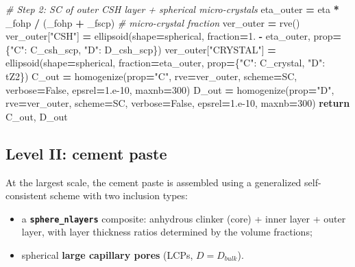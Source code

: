 \documentclass[
  a4paper,
  numbers=noendperiod,
  DIV=12]{scrreprt}
\newenvironment{Shaded}{\begin{snugshade}}{\end{snugshade}}
\newcommand{\CommentTok}[1]{\textcolor[rgb]{0.56,0.35,0.01}{\textit{#1}}}
\newcommand{\ControlFlowTok}[1]{\textcolor[rgb]{0.13,0.29,0.53}{\textbf{#1}}}
\newcommand{\DecValTok}[1]{\textcolor[rgb]{0.00,0.00,0.81}{#1}}
\newcommand{\FloatTok}[1]{\textcolor[rgb]{0.00,0.00,0.81}{#1}}
\newcommand{\NormalTok}[1]{#1}
\newcommand{\OperatorTok}[1]{\textcolor[rgb]{0.81,0.36,0.00}{\textbf{#1}}}
\newcommand{\StringTok}[1]{\textcolor[rgb]{0.31,0.60,0.02}{#1}}
\newcommand{\VariableTok}[1]{\textcolor[rgb]{0.00,0.00,0.00}{#1}}
\providecommand{\tightlist}{%
  \setlength{\itemsep}{0pt}\setlength{\parskip}{0pt}}
\begin{document}
\begin{Shaded}
\begin{Highlighting}[]
    \CommentTok{\# Step 2: SC of outer CSH layer + spherical micro{-}crystals}
\NormalTok{    eta\_outer }\OperatorTok{=}\NormalTok{ eta }\OperatorTok{*}\NormalTok{ \_fohp }\OperatorTok{/}\NormalTok{ (\_fohp }\OperatorTok{+}\NormalTok{ \_fscp)  }\CommentTok{\# micro{-}crystal fraction}
\NormalTok{    ver\_outer }\OperatorTok{=}\NormalTok{ rve()}
\NormalTok{    ver\_outer[}\StringTok{"CSH"}\NormalTok{]     }\OperatorTok{=}\NormalTok{ ellipsoid(shape}\OperatorTok{=}\NormalTok{spherical, fraction}\OperatorTok{=}\FloatTok{1.} \OperatorTok{{-}}\NormalTok{ eta\_outer,}
\NormalTok{                                     prop}\OperatorTok{=}\NormalTok{\{}\StringTok{"C"}\NormalTok{: C\_csh\_scp, }\StringTok{"D"}\NormalTok{: D\_csh\_scp\})}
\NormalTok{    ver\_outer[}\StringTok{"CRYSTAL"}\NormalTok{] }\OperatorTok{=}\NormalTok{ ellipsoid(shape}\OperatorTok{=}\NormalTok{spherical, fraction}\OperatorTok{=}\NormalTok{eta\_outer,}
\NormalTok{                                     prop}\OperatorTok{=}\NormalTok{\{}\StringTok{"C"}\NormalTok{: C\_crystal, }\StringTok{"D"}\NormalTok{: tZ2\})}
\NormalTok{    C\_out }\OperatorTok{=}\NormalTok{ homogenize(prop}\OperatorTok{=}\StringTok{"C"}\NormalTok{, rve}\OperatorTok{=}\NormalTok{ver\_outer, scheme}\OperatorTok{=}\NormalTok{SC,}
\NormalTok{                        verbose}\OperatorTok{=}\VariableTok{False}\NormalTok{, epsrel}\OperatorTok{=}\FloatTok{1.e{-}10}\NormalTok{, maxnb}\OperatorTok{=}\DecValTok{300}\NormalTok{)}
\NormalTok{    D\_out }\OperatorTok{=}\NormalTok{ homogenize(prop}\OperatorTok{=}\StringTok{"D"}\NormalTok{, rve}\OperatorTok{=}\NormalTok{ver\_outer, scheme}\OperatorTok{=}\NormalTok{SC,}
\NormalTok{                        verbose}\OperatorTok{=}\VariableTok{False}\NormalTok{, epsrel}\OperatorTok{=}\FloatTok{1.e{-}10}\NormalTok{, maxnb}\OperatorTok{=}\DecValTok{300}\NormalTok{)}
    \ControlFlowTok{return}\NormalTok{ C\_out, D\_out}
\end{Highlighting}
\end{Shaded}

\subsection{Level II: cement paste}\label{sec-paste-level-ii}

At the largest scale, the cement paste is assembled using a generalized
self-consistent scheme with two inclusion types:

\begin{itemize}
\tightlist
\item
  a \textbf{\texttt{sphere\_nlayers}} composite: anhydrous clinker
  (core) + inner layer + outer layer, with layer thickness ratios
  determined by the volume fractions;
\item
  spherical \textbf{large capillary pores} (LCPs, \(D = D_{bulk}\)).
\end{itemize}
\end{document}
